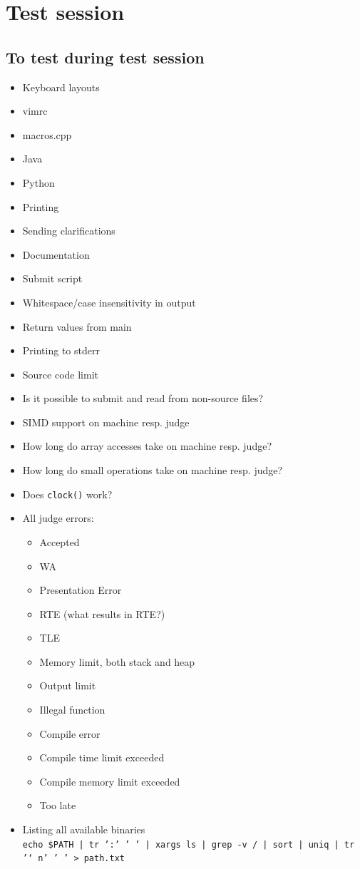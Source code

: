 \appendix
\chapter{Test session}

\section{To test during test session}
\begin{itemize}
	\item Keyboard layouts
	\item vimrc
	\item macros.cpp
	\item Java
	\item Python
	\item Printing
	\item Sending clarifications
	\item Documentation
	\item Submit script
	\item Whitespace/case insensitivity in output
	\item Return values from main
	\item Printing to stderr
	\item Source code limit
	\item Is it possible to submit and read from non-source files?
	\item SIMD support on machine resp. judge
	\item How long do array accesses take on machine resp. judge?
	\item How long do small operations take on machine resp. judge?
	\item Does \texttt{clock()} work?
	\item All judge errors:
		\begin{itemize}
			\item Accepted
			\item WA
			\item Presentation Error
			\item RTE (what results in RTE?)
			\item TLE
			\item Memory limit, both stack and heap
			\item Output limit
			\item Illegal function
			\item Compile error
			\item Compile time limit exceeded
			\item Compile memory limit exceeded
			\item Too late
		\end{itemize}
	\item Listing all available binaries\\
		\texttt{echo \$PATH | tr ':' ' ' | xargs ls | grep -v / | sort | uniq | tr '\char`\\n' ' ' > path.txt}
\end{itemize}
